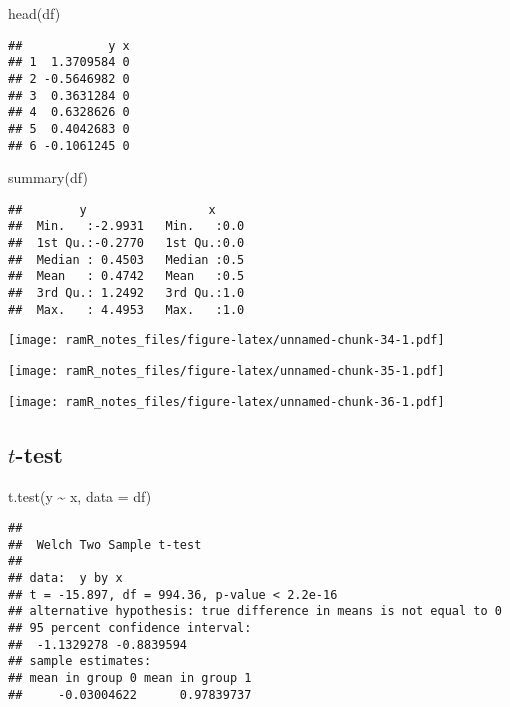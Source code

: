 \documentclass[
]{book}
\newenvironment{Shaded}{\begin{snugshade}}{\end{snugshade}}
\newcommand{\AttributeTok}[1]{\textcolor[rgb]{0.77,0.63,0.00}{#1}}
\newcommand{\FunctionTok}[1]{\textcolor[rgb]{0.00,0.00,0.00}{#1}}
\newcommand{\NormalTok}[1]{#1}
\newcommand{\SpecialCharTok}[1]{\textcolor[rgb]{0.00,0.00,0.00}{#1}}
\theoremstyle{definition}
\theoremstyle{definition}
\theoremstyle{definition}
\theoremstyle{remark}
\begin{document}
\begin{Shaded}
\begin{Highlighting}[]
\FunctionTok{head}\NormalTok{(df)}
\end{Highlighting}
\end{Shaded}

\begin{verbatim}
##            y x
## 1  1.3709584 0
## 2 -0.5646982 0
## 3  0.3631284 0
## 4  0.6328626 0
## 5  0.4042683 0
## 6 -0.1061245 0
\end{verbatim}

\begin{Shaded}
\begin{Highlighting}[]
\FunctionTok{summary}\NormalTok{(df)}
\end{Highlighting}
\end{Shaded}

\begin{verbatim}
##        y                 x      
##  Min.   :-2.9931   Min.   :0.0  
##  1st Qu.:-0.2770   1st Qu.:0.0  
##  Median : 0.4503   Median :0.5  
##  Mean   : 0.4742   Mean   :0.5  
##  3rd Qu.: 1.2492   3rd Qu.:1.0  
##  Max.   : 4.4953   Max.   :1.0
\end{verbatim}

\texttt{[image: ramR\_notes\_files/figure-latex/unnamed-chunk-34-1.pdf]}

\texttt{[image: ramR\_notes\_files/figure-latex/unnamed-chunk-35-1.pdf]}

\texttt{[image: ramR\_notes\_files/figure-latex/unnamed-chunk-36-1.pdf]}

\hypertarget{t-test}{%
\subsection{\texorpdfstring{\(t\)-test}{t-test}}\label{t-test}}

\begin{Shaded}
\begin{Highlighting}[]
\FunctionTok{t.test}\NormalTok{(y }\SpecialCharTok{\textasciitilde{}}\NormalTok{ x, }\AttributeTok{data =}\NormalTok{ df)}
\end{Highlighting}
\end{Shaded}

\begin{verbatim}
## 
##  Welch Two Sample t-test
## 
## data:  y by x
## t = -15.897, df = 994.36, p-value < 2.2e-16
## alternative hypothesis: true difference in means is not equal to 0
## 95 percent confidence interval:
##  -1.1329278 -0.8839594
## sample estimates:
## mean in group 0 mean in group 1 
##     -0.03004622      0.97839737
\end{verbatim}
\end{document}
